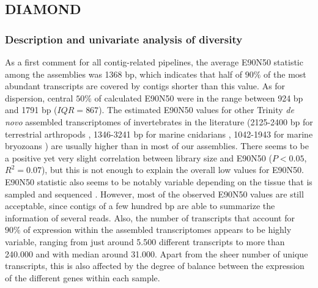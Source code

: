 \documentclass[
  openany]{book}
\begin{document}
\hypertarget{diamond}{%
\subsection{DIAMOND}\label{diamond}}

\hypertarget{e90n50pilot}{%
\subsubsection{Description and univariate analysis of diversity}\label{e90n50pilot}}

As a first comment for all contig-related pipelines, the average E90N50 statistic among the assemblies was 1368 bp, which indicates that half of \(90\%\) of the most abundant transcripts are covered by contigs shorter than this value. As for dispersion, central \(50\%\) of calculated E90N50 were in the range between 924 bp and 1791 bp (\(IQR = 867\)). The estimated E90N50 values for other Trinity \emph{de novo} assembled transcriptomes of invertebrates in the literature (2125-2400 bp for terrestrial arthropods \autocite{Li2022,Oppenheim2018}, 1346-3241 bp for marine cnidarians \autocite{Ashwood2021}, 1042-1943 for marine bryozoans \autocite{Treibergs2020}) are usually higher than in most of our assemblies. There seems to be a positive yet very slight correlation between library size and E90N50 (\(P < 0.05\), \(R^2=0.07\)), but this is not enough to explain the overall low values for E90N50. E90N50 statistic also seems to be notably variable depending on the tissue that is sampled and sequenced \autocite{Treibergs2020}. However, most of the observed E90N50 values are still acceptable, since contigs of a few hundred bp are able to summarize the information of several reads. Also, the number of transcripts that account for \(90\%\) of expression within the assembled transcriptomes appears to be highly variable, ranging from just around 5.500 different transcripts to more than 240.000 and with median around 31.000. Apart from the sheer number of unique transcripts, this is also affected by the degree of balance between the expression of the different genes within each sample.
\end{document}
